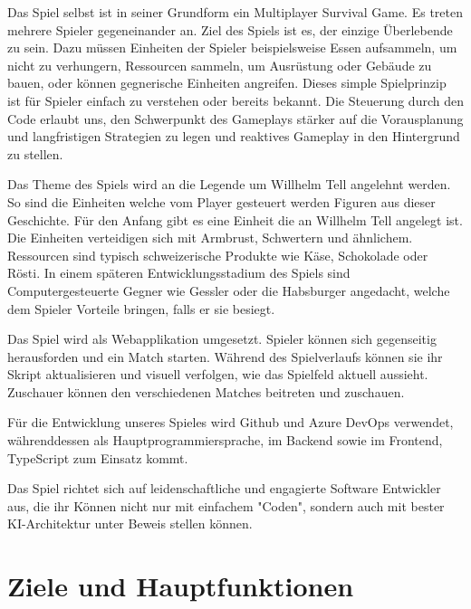 \documentclass[a4paper, 11pt]{scrartcl}
\let\oldsection\section
\renewcommand\section{\clearpage\oldsection}
\begin{document}
Das Spiel selbst ist in seiner Grundform ein Multiplayer Survival Game.
Es treten mehrere Spieler gegeneinander an.
Ziel des Spiels ist es, der einzige Überlebende zu sein.
Dazu müssen Einheiten der Spieler beispielsweise Essen aufsammeln,
um nicht zu verhungern, Ressourcen sammeln, um Ausrüstung oder Gebäude zu bauen,
oder können gegnerische Einheiten angreifen.
Dieses simple Spielprinzip ist für Spieler einfach zu verstehen oder bereits bekannt.
Die Steuerung durch den Code erlaubt uns,
den Schwerpunkt des Gameplays stärker auf die Vorausplanung und langfristigen Strategien
zu legen und reaktives Gameplay in den Hintergrund zu stellen.

Das Theme des Spiels wird an die Legende um Willhelm Tell angelehnt werden. So sind die Einheiten welche vom Player
gesteuert werden Figuren aus dieser Geschichte. Für den Anfang gibt es eine Einheit die an Willhelm Tell angelegt ist.
Die Einheiten verteidigen sich mit Armbrust, Schwertern und ähnlichem. Ressourcen sind typisch schweizerische Produkte
wie Käse, Schokolade oder Rösti. In einem späteren Entwicklungsstadium des Spiels sind Computergesteuerte Gegner
wie Gessler oder die Habsburger angedacht, welche dem Spieler Vorteile bringen, falls er sie besiegt. 

Das Spiel wird als Webapplikation umgesetzt.
Spieler können sich gegenseitig herausforden und ein Match starten.
Während des Spielverlaufs können sie ihr Skript aktualisieren und visuell verfolgen,
wie das Spielfeld aktuell aussieht. Zuschauer können den verschiedenen Matches beitreten und zuschauen.

Für die Entwicklung unseres Spieles wird Github und Azure DevOps verwendet,
währenddessen als Hauptprogrammiersprache, im Backend sowie im Frontend, TypeScript zum Einsatz kommt.

Das Spiel richtet sich auf leidenschaftliche und engagierte Software Entwickler aus, die ihr Können nicht nur mit einfachem "Coden", sondern auch mit bester KI-Architektur unter Beweis stellen können.

\section{Ziele und Hauptfunktionen}
\end{document}
